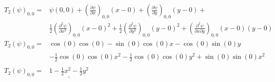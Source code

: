 \begin{align*}
    T_2(\psi)_{0,0} =
    &\psi(0,0)
    +
    \left(\frac{\partial \psi}{\partial x}\right)_{0,0} (x-0)
    +
    \left(\frac{\partial \psi}{\partial y}\right)_{0,0} (y-0)
    +
    \\
    &\frac{1}{2}
    \left(\frac{\partial^2 \psi}{\partial x^2}\right)_{0,0} (x-0)^2
    +
    \frac{1}{2}
    \left(\frac{\partial^2 \psi}{\partial y^2}\right)_{0,0} (y-0)^2
    +
    \left(\frac{\partial^2 \psi}{\partial x\partial y}\right)_{0,0} (x-0)(y-0)
    \\
    T_2(\psi)_{0,0} =
    &\cos(0)\cos(0)
    -\sin(0)\cos(0)x
    -\cos(0)\sin(0)y
    \\
    &-\frac{1}{2}
    \cos(0)\cos(0)x^2
    -
    \frac{1}{2}
    \cos(0)\cos(0)y^2
    +
    \sin(0)\sin(0)x^2
    \\
    \\
    T_2(\psi)_{0,0} =
    &\underline{\underline{
    1
    -\frac{1}{2}
    x^2
    -
    \frac{1}{2}
    y^2
    }}
\end{align*}





















%
